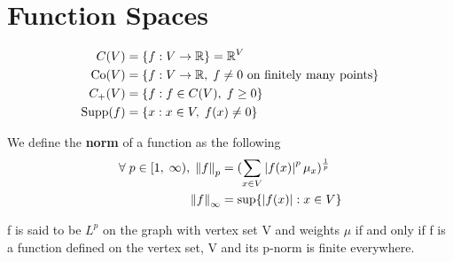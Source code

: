 \documentclass[main]{subfiles}
\begin{document}
\section{Function Spaces}
\begin{definition}
    \begin{align*}
        C(V)     & = \{f: V \to \mathbb R\} = \mathbb R^V                                     \\
        \operatorname{Co}(V)   & = \{f: V \to \mathbb R,\;f \neq 0 \text{ on finitely many points}\} \\
        C_+(V)   & = \{f: f \in C(V),\;f \geq 0\}                               \\
        \operatorname{Supp}(f) & = \{x: x \in V,\;f(x) \neq 0\}                               \\
    \end{align*}
\end{definition}
\begin{definition}
    We define the \textbf{norm} of a function as the following
    \begin{align*}
        \forall\;p \in [1,\;\infty),\;\left\lVert f\right\rVert_{p} & = (\sum_{x \in V}\left\lvert f(x)\right\rvert^p \mu_x)^{\frac{1}{p}} \\
        \left\lVert f\right\rVert_{\infty}                          & = \sup\{{\left\lvert f(x)\right\rvert: x \in V}\}
    \end{align*}
\end{definition}
f is said to be $L^p$ on the graph with vertex set V and weights $\mu$ if and only if f is a function defined on the vertex set, V and its p-norm is finite everywhere.
\end{document}
